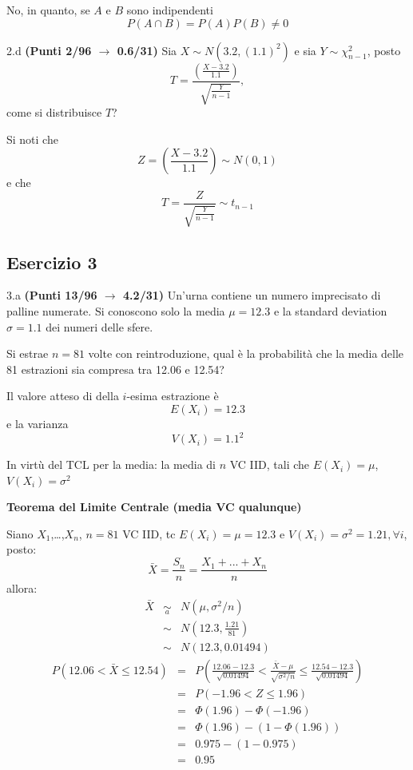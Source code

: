 \documentclass[
  11pt,
]{book}
\theoremstyle{mytheoremstyle}
\theoremstyle{mydefstyle}
\newenvironment{sol}
  {
  \begin{tcolorbox}[enhanced,breakable,arc=0.1mm,boxrule=1pt,colback=white,colframe=iblue,
  title=\bf \fontfamily{lmss}\selectfont \hspace{.5 cm} Soluzione,drop fuzzy shadow]

}{
\end{tcolorbox}
  }
\begin{document}
\begin{sol}
No, in quanto, se \(A\) e \(B\) sono indipendenti
\[P(A\cap B)=P(A)P(B)\neq0\]

\end{sol}

2.d \textbf{(Punti 2/96 \(\rightarrow\) 0.6/31)} Sia \(X\sim N(3.2,(1.1)^2)\) e sia \(Y\sim\chi_{n-1}^2\), posto
\[
T=\frac{\left(\frac{X-3.2}{1.1}\right)}{\sqrt{\frac{Y}{n-1}}},
\]
come si distribuisce \(T\)?

\begin{sol}
Si noti che
\[
Z=\left(\frac{X-3.2}{1.1}\right)\sim N(0,1)
\]
e che
\[
T=\frac{Z}{\sqrt{\frac{Y}{n-1}}}\sim t_{n-1}
\]

\end{sol}

\subsection{Esercizio 3}\label{esercizio-3-5}

3.a \textbf{(Punti 13/96 \(\rightarrow\) 4.2/31)} Un'urna contiene un numero imprecisato di palline numerate. Si conoscono solo
la media \(\mu=12.3\) e la standard deviation \(\sigma=1.1\) dei numeri delle sfere.

Si estrae \(n=81\) volte con reintroduzione, qual è la probabilità che la media delle 81 estrazioni sia compresa tra
12.06 e 12.54?

\begin{sol}
Il valore atteso di della \(i\)-esima estrazione è
\[
E(X_i)=12.3
\]
e la varianza
\[
V(X_i)=1.1^2
\]

In virtù del TCL per la media: la media di \(n\) VC IID, tali che
\(E(X_i)=\mu\), \(V(X_i)=\sigma^2\)

\textbf{Teorema del Limite Centrale (media VC qualunque)}

Siano \(X_1\),\ldots,\(X_n\), \(n=81\) VC IID, tc \(E(X_i)=\mu=12.3\) e \(V(X_i)=\sigma^2=1.21,\forall i\), posto:
\[
      \bar X=\frac{S_n}n =\frac{X_1 + ... + X_n}n
      \]
allora:\begin{eqnarray*}
  \bar X & \mathop{\sim}\limits_{a}& N(\mu,\sigma^2/n) \\
     &\sim & N\left(12.3,\frac{1.21}{81}\right) \\
     &\sim & N(12.3,0.01494)
  \end{eqnarray*}\begin{eqnarray*}
   P( 12.06 < \bar X \leq  12.54 ) &=& P\left( \frac { 12.06  -  12.3 }{\sqrt{ 0.01494 }} < \frac { \bar X  -  \mu }{ \sqrt{\sigma^2/n} } \leq \frac { 12.54  -  12.3 }{\sqrt{ 0.01494 }}\right)  \\
              &=& P\left(  -1.96  < Z \leq  1.96 \right) \\
              &=& \Phi( 1.96 )-\Phi( -1.96 )\\
              &=&  \Phi( 1.96 )-(1-\Phi( 1.96 )) \\ &=&  0.975 -(1- 0.975 ) \\ 
              &=&  0.95 
   \end{eqnarray*}

\end{sol}
\end{document}
